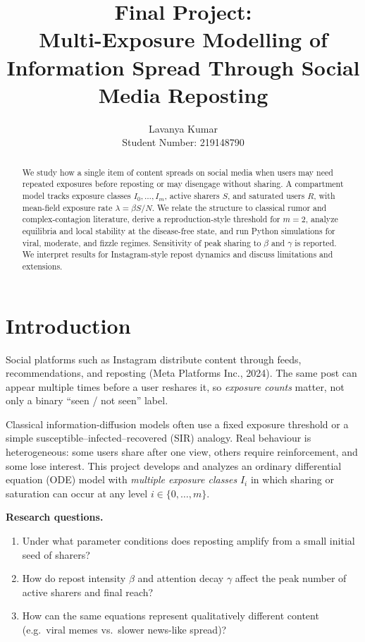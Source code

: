 \documentclass[11pt]{article}
\title{Final Project:\\Multi-Exposure Modelling of Information Spread Through Social Media Reposting}
\author{Lavanya Kumar\\Student Number: 219148790}
\date{}
\begin{document}
\maketitle

\begin{abstract}
\noindent
We study how a single item of content spreads on social media when users may need repeated exposures before reposting or may disengage without sharing. A compartment model tracks exposure classes $I_0,\ldots,I_m$, active sharers $S$, and saturated users $R$, with mean-field exposure rate $\lambda=\beta S/N$. We relate the structure to classical rumor and complex-contagion literature, derive a reproduction-style threshold for $m=2$, analyze equilibria and local stability at the disease-free state, and run Python simulations for viral, moderate, and fizzle regimes. Sensitivity of peak sharing to $\beta$ and $\gamma$ is reported. We interpret results for Instagram-style repost dynamics and discuss limitations and extensions.
\end{abstract}

\section{Introduction}

Social platforms such as Instagram distribute content through feeds, recommendations, and reposting (Meta Platforms Inc., 2024). The same post can appear multiple times before a user reshares it, so \emph{exposure counts} matter, not only a binary ``seen / not seen'' label.

Classical information-diffusion models often use a fixed exposure threshold or a simple susceptible--infected--recovered (SIR) analogy. Real behaviour is heterogeneous: some users share after one view, others require reinforcement, and some lose interest. This project develops and analyzes an ordinary differential equation (ODE) model with \emph{multiple exposure classes} $I_i$ in which sharing or saturation can occur at any level $i\in\{0,\ldots,m\}$.

\textbf{Research questions.}
\begin{enumerate}
    \item Under what parameter conditions does reposting amplify from a small initial seed of sharers?
    \item How do repost intensity $\beta$ and attention decay $\gamma$ affect the peak number of active sharers and final reach?
    \item How can the same equations represent qualitatively different content (e.g.\ viral memes vs.\ slower news-like spread)?
\end{enumerate}
\end{document}
